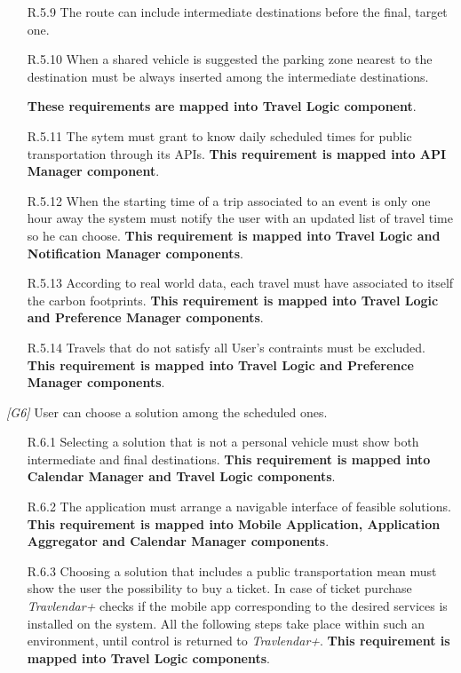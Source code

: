 \begin{description}
\begin{itemize}
			\item [R.5.9] The route can include intermediate destinations before the final, target one.

			\item [R.5.10] When a shared vehicle is suggested the parking zone nearest to the destination must be always inserted among the intermediate destinations.
			
			\textbf{These requirements are mapped into Travel Logic component}.


			\item [R.5.11] The sytem must grant to know daily scheduled times for public transportation through its APIs.
			\textbf{This requirement is mapped into API Manager component}.

			\item [R.5.12] When the starting time of a trip associated to an event is only one hour away the system must notify the user with an updated list of travel time so he can choose.
			\textbf{This requirement is mapped into Travel Logic and Notification Manager components}.

			\item [R.5.13] According to real world data, each travel must have associated to itself the carbon footprints.
			\textbf{This requirement is mapped into Travel Logic and Preference Manager components}.

			\item [R.5.14] Travels that do not satisfy all User's contraints must be excluded.			
			\textbf{This requirement is mapped into Travel Logic and Preference Manager components}.
		\end{itemize}
		


	\vskip0.75cm
	\item \textit{[G6]} User can choose a solution among the scheduled ones. 
		\begin{itemize}
			\item [R.6.1] Selecting a solution that is not a personal vehicle must show both intermediate and final destinations.
			\textbf{This requirement is mapped into Calendar Manager and Travel Logic components}.

			\item [R.6.2] The application must arrange a navigable interface of feasible solutions.
			\textbf{This requirement is mapped into Mobile Application, Application Aggregator and Calendar Manager components}.

			\item [R.6.3] Choosing a solution that includes a public transportation mean must show the user the possibility to buy a ticket. In case of ticket purchase \textit{Travlendar+} checks if the mobile app corresponding to the desired services is installed on the system. All the following steps take place within such an environment, until control is returned to \textit{Travlendar+}.
			\textbf{This requirement is mapped into Travel Logic components}.


\end{itemize}
\end{description}
